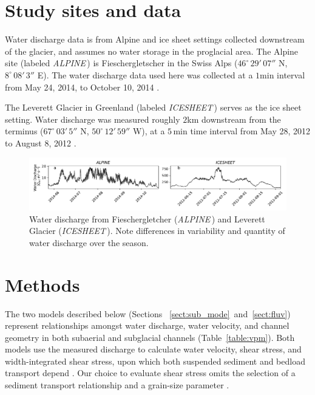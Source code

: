 \documentclass[esurf, manuscript]{copernicus}
\newcommand{\alpine}{\textit{ALPINE}\,}
\newcommand{\icesheet}{\textit{ICESHEET}\,}
\begin{document}
\section{Study sites and data}
\label{sect:ss_data}

Water discharge data is from Alpine and ice sheet settings collected downstream of the glacier, and assumes no water storage in the proglacial area.
The Alpine site (labeled \alpine{}) is  Fieschergletscher in the Swiss Alps ($46^\circ\,29'\,07''$ N, $8^\circ\,08'\,3''$ E).
The water discharge data used here was collected at a $1$\unit{min} interval from May 24, 2014, to October 10, 2014 \citep[Figure~\ref{fig:Qw}\,a][]{felix2022}.

The Leverett Glacier in Greenland (labeled \icesheet{}) serves as the ice sheet setting.
Water discharge was measured roughly $2$\unit{km} downstream from the terminus ($67^\circ\,03'\,5''$ N, $50^\circ\,12'\,59''$ W), at a $5$\,\unit{min} time interval from May 28, 2012 to August 8, 2012 \citet[][Figure~\ref{fig:Qw}\,b]{tedstone2013}.



\begin{figure}[hbt!]
  \centering
  \includegraphics[width=0.9\linewidth]{Fig2.pdf}
  \caption{Water discharge from Fieschergletcher (\alpine) and Leverett Glacier (\icesheet).
    Note differences in variability and quantity of water discharge over the season.
  }
  \label{fig:Qw}
\end{figure}


\section{Methods}
\label{sect:meth}
The two models described below (Sections ~\ref{sect:sub_mode}~and~\ref{sect:fluv}) represent relationships amongst water discharge, water velocity, and channel geometry in both subaerial and subglacial channels (Table~\ref{table:vpm}).
Both models use the measured discharge to calculate water velocity, shear stress, and width-integrated shear stress, upon which both suspended sediment and bedload transport depend \citep[Figure \ref{fig:cartoon}; ][]{shields1936}.
Our choice to evaluate shear stress omits the selection of a sediment transport relationship and a grain-size parameter \citep[e.g.][]{shields1936,meyer1948}.
\end{document}
